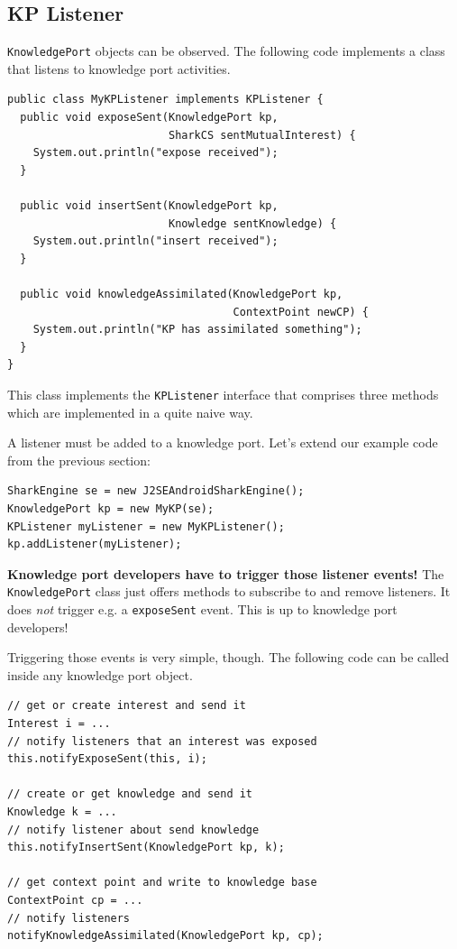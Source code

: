 \subsection{KP Listener}
{\tt KnowledgePort} objects can be observed. The following code implements a class that listens to knowledge port activities.

\begin{verbatim}
public class MyKPListener implements KPListener {
  public void exposeSent(KnowledgePort kp, 
                         SharkCS sentMutualInterest) {
    System.out.println("expose received");
  }

  public void insertSent(KnowledgePort kp, 
                         Knowledge sentKnowledge) {
    System.out.println("insert received");
  }

  public void knowledgeAssimilated(KnowledgePort kp, 
                                   ContextPoint newCP) {
    System.out.println("KP has assimilated something");
  }
}
\end{verbatim}

This class implements the {\tt KPListener} interface that comprises three methods which are implemented in a quite naive way.

A listener must be added to a knowledge port. Let's extend our example code from the previous section:

\begin{verbatim}
SharkEngine se = new J2SEAndroidSharkEngine();
KnowledgePort kp = new MyKP(se);
KPListener myListener = new MyKPListener();
kp.addListener(myListener);
\end{verbatim}

{\bf Knowledge port developers have to trigger those listener events!} The {\tt KnowledgePort} class just offers methods to subscribe to and remove listeners.
It does {\it not} trigger e.g. a {\tt exposeSent} event. This is up to knowledge port developers!

Triggering those events is very simple, though. The following code can be called inside any knowledge port object.

\begin{verbatim}
// get or create interest and send it
Interest i = ...
// notify listeners that an interest was exposed
this.notifyExposeSent(this, i);

// create or get knowledge and send it
Knowledge k = ...
// notify listener about send knowledge
this.notifyInsertSent(KnowledgePort kp, k);

// get context point and write to knowledge base
ContextPoint cp = ...
// notify listeners
notifyKnowledgeAssimilated(KnowledgePort kp, cp);
\end{verbatim}

